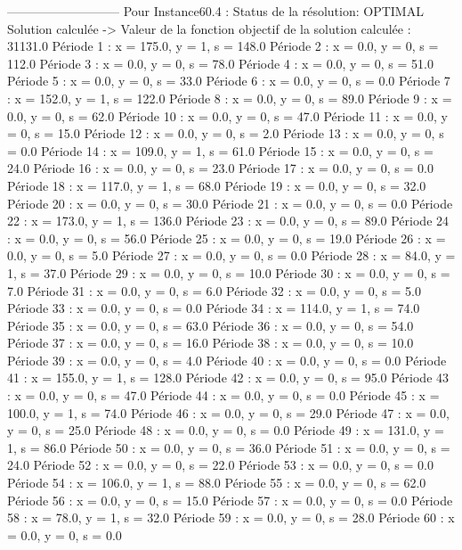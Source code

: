 ---------------------------
Pour Instance60.4  :
Status de la résolution: OPTIMAL
Solution calculée
-> Valeur de la fonction objectif de la solution calculée :  31131.0
Période 1 : x = 175.0, y = 1, s = 148.0
Période 2 : x = 0.0, y = 0, s = 112.0
Période 3 : x = 0.0, y = 0, s = 78.0
Période 4 : x = 0.0, y = 0, s = 51.0
Période 5 : x = 0.0, y = 0, s = 33.0
Période 6 : x = 0.0, y = 0, s = 0.0
Période 7 : x = 152.0, y = 1, s = 122.0
Période 8 : x = 0.0, y = 0, s = 89.0
Période 9 : x = 0.0, y = 0, s = 62.0
Période 10 : x = 0.0, y = 0, s = 47.0
Période 11 : x = 0.0, y = 0, s = 15.0
Période 12 : x = 0.0, y = 0, s = 2.0
Période 13 : x = 0.0, y = 0, s = 0.0
Période 14 : x = 109.0, y = 1, s = 61.0
Période 15 : x = 0.0, y = 0, s = 24.0
Période 16 : x = 0.0, y = 0, s = 23.0
Période 17 : x = 0.0, y = 0, s = 0.0
Période 18 : x = 117.0, y = 1, s = 68.0
Période 19 : x = 0.0, y = 0, s = 32.0
Période 20 : x = 0.0, y = 0, s = 30.0
Période 21 : x = 0.0, y = 0, s = 0.0
Période 22 : x = 173.0, y = 1, s = 136.0
Période 23 : x = 0.0, y = 0, s = 89.0
Période 24 : x = 0.0, y = 0, s = 56.0
Période 25 : x = 0.0, y = 0, s = 19.0
Période 26 : x = 0.0, y = 0, s = 5.0
Période 27 : x = 0.0, y = 0, s = 0.0
Période 28 : x = 84.0, y = 1, s = 37.0
Période 29 : x = 0.0, y = 0, s = 10.0
Période 30 : x = 0.0, y = 0, s = 7.0
Période 31 : x = 0.0, y = 0, s = 6.0
Période 32 : x = 0.0, y = 0, s = 5.0
Période 33 : x = 0.0, y = 0, s = 0.0
Période 34 : x = 114.0, y = 1, s = 74.0
Période 35 : x = 0.0, y = 0, s = 63.0
Période 36 : x = 0.0, y = 0, s = 54.0
Période 37 : x = 0.0, y = 0, s = 16.0
Période 38 : x = 0.0, y = 0, s = 10.0
Période 39 : x = 0.0, y = 0, s = 4.0
Période 40 : x = 0.0, y = 0, s = 0.0
Période 41 : x = 155.0, y = 1, s = 128.0
Période 42 : x = 0.0, y = 0, s = 95.0
Période 43 : x = 0.0, y = 0, s = 47.0
Période 44 : x = 0.0, y = 0, s = 0.0
Période 45 : x = 100.0, y = 1, s = 74.0
Période 46 : x = 0.0, y = 0, s = 29.0
Période 47 : x = 0.0, y = 0, s = 25.0
Période 48 : x = 0.0, y = 0, s = 0.0
Période 49 : x = 131.0, y = 1, s = 86.0
Période 50 : x = 0.0, y = 0, s = 36.0
Période 51 : x = 0.0, y = 0, s = 24.0
Période 52 : x = 0.0, y = 0, s = 22.0
Période 53 : x = 0.0, y = 0, s = 0.0
Période 54 : x = 106.0, y = 1, s = 88.0
Période 55 : x = 0.0, y = 0, s = 62.0
Période 56 : x = 0.0, y = 0, s = 15.0
Période 57 : x = 0.0, y = 0, s = 0.0
Période 58 : x = 78.0, y = 1, s = 32.0
Période 59 : x = 0.0, y = 0, s = 28.0
Période 60 : x = 0.0, y = 0, s = 0.0

